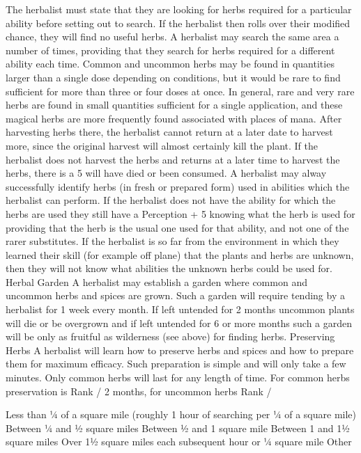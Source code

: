 \documentclass[a4paper]{article}
\begin{document}
\begin{multicols}{3}
The herbalist must state that they are looking for
herbs required for a particular ability before setting
out to search. If the herbalist then rolls over their
modified chance, they will find no useful herbs. A
herbalist may search the same area a number of
times, providing that they search for herbs required
for a different ability each time.
Common and uncommon herbs may be found in
quantities larger than a single dose depending on
conditions, but it would be rare to find sufficient
for more than three or four doses at once.
In general, rare and very rare herbs are found in
small quantities sufficient for a single application,
and these magical herbs are more frequently found
associated with places of mana.
After harvesting herbs there, the herbalist cannot
return at a later date to harvest more, since the
original harvest will almost certainly kill the plant.
If the herbalist does not harvest the herbs and returns at a later time to harvest the herbs, there is a
5%
will have died or been consumed.
A herbalist may alway successfully identify herbs
(in fresh or prepared form) used in abilities which
the herbalist can perform. If the herbalist does not
have the ability for which the herbs are used they
still have a Perception + 5%
knowing what the herb is used for providing that
the herb is the usual one used for that ability, and
not one of the rarer substitutes.
If the herbalist is so far from the environment in
which they learned their skill (for example off
plane) that the plants and herbs are unknown, then
they will not know what abilities the unknown
herbs could be used for.
Herbal Garden
A herbalist may establish a garden where common
and uncommon herbs and spices are grown. Such a
garden will require tending by a herbalist for 1
week every month. If left untended for 2 months
uncommon plants will die or be overgrown and if
left untended for 6 or more months such a garden
will be only as fruitful as wilderness (see above)
for finding herbs.
Preserving Herbs
A herbalist will learn how to preserve herbs and
spices and how to prepare them for maximum
efficacy. Such preparation is simple and will only
take a few minutes. Only common herbs will last
for any length of time. For common herbs preservation is Rank / 2 months, for uncommon herbs
Rank /

Less than ¼ of a square mile (roughly 1
hour of searching per ¼ of a square mile)
Between ¼ and ½ square miles
Between ½ and 1 square mile
Between 1 and 1½ square miles
Over 1½ square miles
each subsequent hour or ¼ square mile
Other


\end{multicols}
\end{document}

